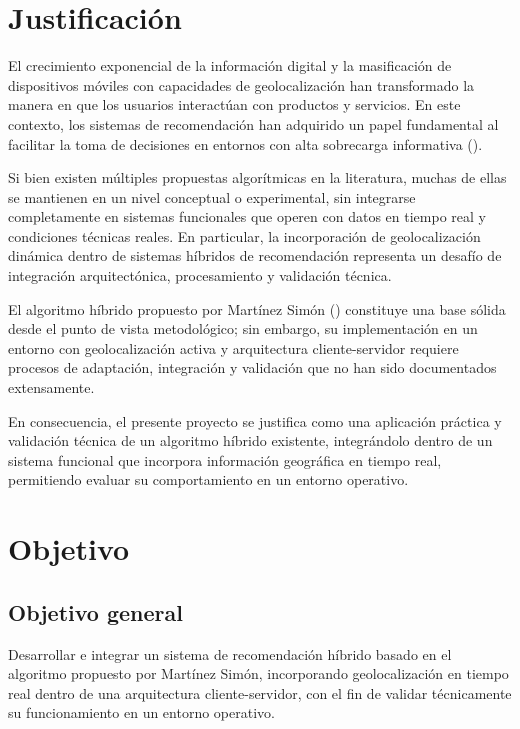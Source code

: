 \documentclass[11pt, letterpaper]{article}
\begin{document}
	\section{Justificación}
	
	El crecimiento exponencial de la información digital y la masificación de dispositivos móviles con capacidades de geolocalización han transformado la manera en que los usuarios interactúan con productos y servicios. En este contexto, los sistemas de recomendación han adquirido un papel fundamental al facilitar la toma de decisiones en entornos con alta sobrecarga informativa (\cite{revision_sr_turismo}).
	
	Si bien existen múltiples propuestas algorítmicas en la literatura, muchas de ellas se mantienen en un nivel conceptual o experimental, sin integrarse completamente en sistemas funcionales que operen con datos en tiempo real y condiciones técnicas reales. En particular, la incorporación de geolocalización dinámica dentro de sistemas híbridos de recomendación representa un desafío de integración arquitectónica, procesamiento y validación técnica.
	
	El algoritmo híbrido propuesto por Martínez Simón (\cite{dael_recomendacion_hibrida}) constituye una base sólida desde el punto de vista metodológico; sin embargo, su implementación en un entorno con geolocalización activa y arquitectura cliente-servidor requiere procesos de adaptación, integración y validación que no han sido documentados extensamente.
	
	En consecuencia, el presente proyecto se justifica como una aplicación práctica y validación técnica de un algoritmo híbrido existente, integrándolo dentro de un sistema funcional que incorpora información geográfica en tiempo real, permitiendo evaluar su comportamiento en un entorno operativo.
	
	\section{Objetivo}
	
	\subsection{Objetivo general}
	Desarrollar e integrar un sistema de recomendación híbrido basado en el algoritmo propuesto por Martínez Simón, incorporando geolocalización en tiempo real dentro de una arquitectura cliente-servidor, con el fin de validar técnicamente su funcionamiento en un entorno operativo.
	
\end{document}
